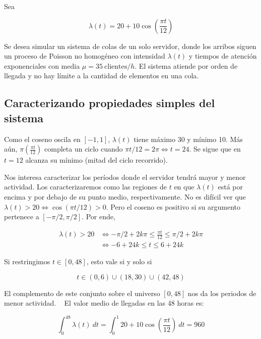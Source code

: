 \documentclass[a4paper, 12pt]{article}
\begin{document}
Sea 

\begin{equation}
    \lambda(t) = 20 + 10\cos \left( \frac{\pi t}{12} \right) 
\end{equation}

Se desea simular un sistema de colas de un solo servidor, donde los arribos
siguen un proceso de Poisson no homogéneo con intensidad $\lambda(t)$ y tiempos
de atención exponenciales con media $\mu = 35 ~ \text{clientes}/h$. El sistema
atiende por orden de llegada y no hay límite a la cantidad de elementos en una
cola.

\subsection{Caracterizando propiedades simples del sistema}

Como el coseno oscila en $[-1, 1]$, $\lambda(t)$ tiene máximo 30 y mínimo 10. Más
aún, $\pi\left( \frac{\pi t}{12} \right) $ completa un ciclo cuando $\pi t / 12
= 2 \pi \iff t = 24$. Se sigue que en $t = 12$ alcanza su mínimo (mitad del
ciclo recorrido). 

Nos interesa caracterizar los períodos donde el servidor tendrá mayor y menor
actividad. Los caracterizaremos como las regiones de $t$ en que $\lambda(t)$
está por encima y por debajo de su punto medio, respectivamente.
No es difícil ver que $\lambda(t) > 20 \iff \cos(\pi t / 12) > 0$. Pero el
coseno es positivo si su argumento pertenece a $[- \pi / 2, \pi / 2]$. Por ende, 

\begin{align}
    \lambda(t) > 20 &\iff -\pi / 2 + 2k\pi \leq \frac{\pi t}{12}  \leq \pi / 2 +
    2k \pi\\ 
                    &\iff-6 + 24k \leq t \leq 6 + 24k
\end{align}

Si restringimos $t \in [0, 48]$, esto vale si y solo si 

\begin{equation}
    t \in (0, 6) \cup  (18, 30) \cup  (42, 48)
\end{equation}

El complemento de este conjunto sobre el universo $[0, 48]$ nos da los periodos
de menor actividad.
~
El valor medio de llegadas en las 48 horas es:

\begin{equation}
\int_0^{48} \lambda(t) ~ dt = \int_0^1 
20 + 10 \cos(\frac{\pi
    t}{12})
    ~ dt = 960
\end{equation}
\end{document}
